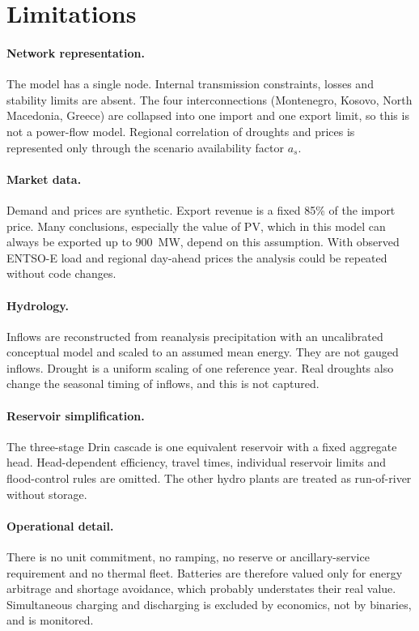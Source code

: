 \section{Limitations}
\label{sec:limitations}

\paragraph{Network representation.} The model has a single node. Internal transmission constraints, losses and
stability limits are absent. The four interconnections (Montenegro, Kosovo, North Macedonia, Greece) are
collapsed into one import and one export limit, so this is not a power-flow model. Regional correlation of
droughts and prices is represented only through the scenario availability factor $a_s$.

\paragraph{Market data.} Demand and prices are synthetic. Export revenue is a fixed 85\% of the import price.
Many conclusions, especially the value of PV, which in this model can always be exported up to 900~MW, depend
on this assumption. With observed ENTSO-E load and regional day-ahead prices the analysis could be repeated
without code changes.

\paragraph{Hydrology.} Inflows are reconstructed from reanalysis precipitation with an uncalibrated conceptual
model and scaled to an assumed mean energy. They are not gauged inflows. Drought is a uniform scaling of one
reference year. Real droughts also change the seasonal timing of inflows, and this is not captured.

\paragraph{Reservoir simplification.} The three-stage Drin cascade is one equivalent reservoir with a fixed
aggregate head. Head-dependent efficiency, travel times, individual reservoir limits and flood-control rules
are omitted. The other hydro plants are treated as run-of-river without storage.

\paragraph{Operational detail.} There is no unit commitment, no ramping, no reserve or ancillary-service
requirement and no thermal fleet. Batteries are therefore valued only for energy arbitrage and shortage
avoidance, which probably understates their real value. Simultaneous charging and discharging is excluded by
economics, not by binaries, and is monitored.

